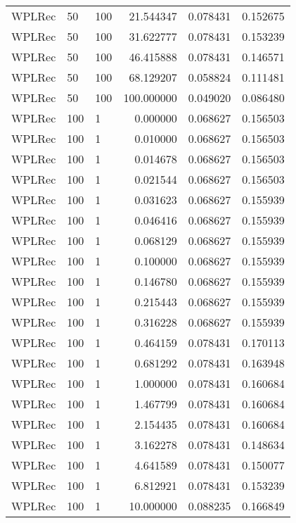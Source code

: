 \begin{tabular}{lllrrr}
 WPLRec &   50 &    100 &   21.544347 &     0.078431 &  0.152675 \\
 WPLRec &   50 &    100 &   31.622777 &     0.078431 &  0.153239 \\
 WPLRec &   50 &    100 &   46.415888 &     0.078431 &  0.146571 \\
 WPLRec &   50 &    100 &   68.129207 &     0.058824 &  0.111481 \\
 WPLRec &   50 &    100 &  100.000000 &     0.049020 &  0.086480 \\
 WPLRec &  100 &      1 &    0.000000 &     0.068627 &  0.156503 \\
 WPLRec &  100 &      1 &    0.010000 &     0.068627 &  0.156503 \\
 WPLRec &  100 &      1 &    0.014678 &     0.068627 &  0.156503 \\
 WPLRec &  100 &      1 &    0.021544 &     0.068627 &  0.156503 \\
 WPLRec &  100 &      1 &    0.031623 &     0.068627 &  0.155939 \\
 WPLRec &  100 &      1 &    0.046416 &     0.068627 &  0.155939 \\
 WPLRec &  100 &      1 &    0.068129 &     0.068627 &  0.155939 \\
 WPLRec &  100 &      1 &    0.100000 &     0.068627 &  0.155939 \\
 WPLRec &  100 &      1 &    0.146780 &     0.068627 &  0.155939 \\
 WPLRec &  100 &      1 &    0.215443 &     0.068627 &  0.155939 \\
 WPLRec &  100 &      1 &    0.316228 &     0.068627 &  0.155939 \\
 WPLRec &  100 &      1 &    0.464159 &     0.078431 &  0.170113 \\
 WPLRec &  100 &      1 &    0.681292 &     0.078431 &  0.163948 \\
 WPLRec &  100 &      1 &    1.000000 &     0.078431 &  0.160684 \\
 WPLRec &  100 &      1 &    1.467799 &     0.078431 &  0.160684 \\
 WPLRec &  100 &      1 &    2.154435 &     0.078431 &  0.160684 \\
 WPLRec &  100 &      1 &    3.162278 &     0.078431 &  0.148634 \\
 WPLRec &  100 &      1 &    4.641589 &     0.078431 &  0.150077 \\
 WPLRec &  100 &      1 &    6.812921 &     0.078431 &  0.153239 \\
 WPLRec &  100 &      1 &   10.000000 &     0.088235 &  0.166849 \\

\end{tabular}
